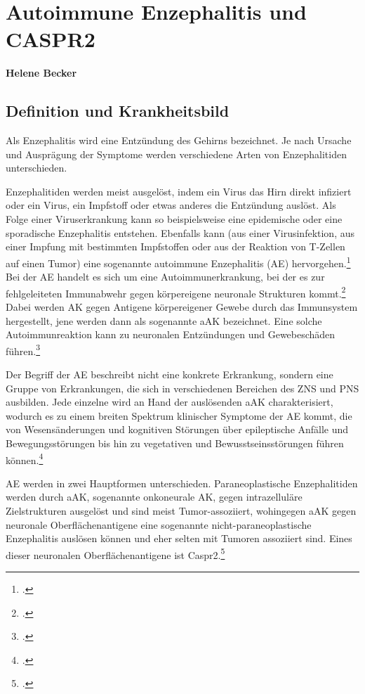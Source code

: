 \chapter{Autoimmune Enzephalitis und CASPR2}
\textbf{Helene Becker}
\section{Definition und Krankheitsbild}
Als Enzephalitis wird eine Entzündung des Gehirns bezeichnet.
Je nach Ursache und Ausprägung der Symptome werden verschiedene Arten
von Enzephalitiden unterschieden.

Enzephalitiden werden meist ausgelöst, indem ein Virus das Hirn direkt
infiziert oder ein Virus, ein Impfstoff oder etwas anderes die Entzündung
auslöst. Als Folge einer Viruserkrankung kann so beispielsweise eine
epidemische oder eine sporadische Enzephalitis entstehen. Ebenfalls kann
(aus einer Virusinfektion, aus einer Impfung mit bestimmten Impfstoffen
oder aus der Reaktion von T-Zellen auf einen Tumor) eine sogenannte
autoimmune Enzephalitis (AE) hervorgehen.\footcite{Klein2026}
Bei der AE handelt es sich um eine Autoimmunerkrankung, bei der es zur
fehlgeleiteten Immunabwehr gegen körpereigene neuronale Strukturen
kommt.\footcites{Klein2026}{Fernandez2026}
Dabei werden AK gegen Antigene körpereigener Gewebe durch das
Immunsystem hergestellt, jene werden dann als sogenannte aAK
bezeichnet. Eine solche Autoimmunreaktion kann zu neuronalen
Entzündungen und Gewebeschäden führen.\footcite{Fernandez2026}

Der Begriff der AE beschreibt nicht eine konkrete Erkrankung, sondern
eine Gruppe von Erkrankungen, die sich in verschiedenen Bereichen des
ZNS und PNS ausbilden. Jede
einzelne wird an Hand der auslösenden aAK charakterisiert, wodurch es zu
einem breiten Spektrum klinischer Symptome der AE kommt, die von
Wesensänderungen und kognitiven Störungen über epileptische Anfälle und
Bewegungsstörungen bis hin zu vegetativen und Bewusstseinsstörungen
führen können.\footcite[S.~525]{Heine2022}

AE werden in zwei Hauptformen unterschieden. Paraneoplastische
Enzephalitiden werden durch aAK, sogenannte onkoneurale AK, gegen
intrazelluläre Zielstrukturen ausgelöst und sind meist Tumor-assoziiert,
wohingegen aAK gegen neuronale Oberflächenantigene eine sogenannte
nicht-paraneoplastische Enzephalitis auslösen können und eher selten mit
Tumoren assoziiert sind. Eines dieser neuronalen Oberflächenantigene ist
Caspr2.\footcite[S.~526--528]{Heine2022}

